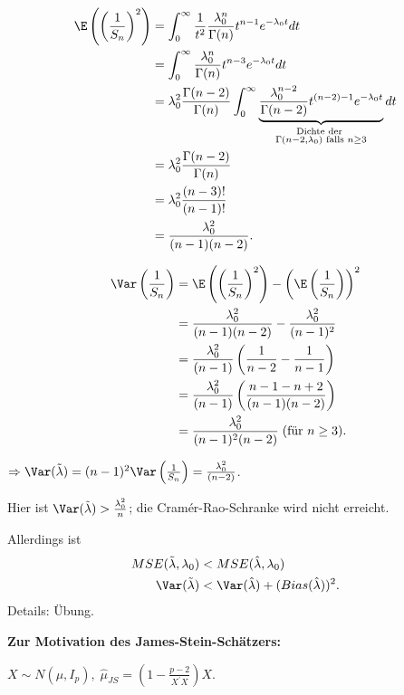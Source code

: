 \documentclass{tstextbook}
\begin{document}
\begin{example}
	\[
	\begin{aligned}
		\E\left(\left(\frac{1}{S_n}\right)^2\right) & =  \int_{0}^{\infty} \frac{1}{t^2}\frac{\lambda_0^n}{\Gamma(n)}t^{n-1}e^{-\lambda_0t}dt \\
		& = \int_{0}^{\infty} \frac{\lambda_0^n}{\Gamma(n)}t^{n-3}e^{-\lambda_0t}dt \\
		& = \lambda_0^2 \frac{\Gamma(n-2)}{\Gamma(n)} \int_{0}^{\infty} \underbrace{\frac{\lambda_0^{n-2}}{\Gamma(n-2)}t^{(n-2)-1}e^{-\lambda_0t}}_{\substack{\text{Dichte der } \\ \Gamma(n-2,\lambda_0) \text{ falls }n\ge3}} dt \\
		& = \lambda_0^2 \frac{\Gamma(n-2)}{\Gamma(n)} \\
		& = \lambda_0^2 \frac{(n-3)!}{(n-1)!} \\
		& = \frac{\lambda_0^2}{(n-1)(n-2)}.
	\end{aligned}
	\]
	
	\[
	\begin{aligned}
		\Var\left(\frac{1}{S_n}\right) & = \E\left(\left(\frac{1}{S_n}\right)^2\right) - \left(\E\left(\frac{1}{S_n}\right)\right)^2 \\
		& = \frac{\lambda_0^2}{(n-1)(n-2)} - \frac{\lambda_0^2}{(n-1)^2} \\
		& = \frac{\lambda_0^2}{(n-1)}\left(\frac{1}{n-2}-\frac{1}{n-1}\right) \\
		& = \frac{\lambda_0^2}{(n-1)}\left(\frac{n-1-n+2}{(n-1)(n-2)}\right) \\
		& = \frac{\lambda_0^2}{(n-1)^2(n-2)} \; (\text{für }n\ge3).
	\end{aligned}
	\]
	
	$ \Rightarrow \Var(\tilde{\lambda}) = (n-1)^2\Var\left(\frac{1}{S_n}\right) = \frac{\lambda_0^2}{(n-2)} $. 
	
	Hier ist $ \Var(\tilde{\lambda}) > \frac{\lambda_0^2}{n} $; die Cramér-Rao-Schranke wird nicht erreicht.
	
	Allerdings ist 
	\[
	\begin{aligned}
		MSE(\tilde{\lambda},\lambda_0) & < MSE(\hat{\lambda},\lambda_0) \\
		\Var(\tilde{\lambda}) & < \Var(\hat{\lambda}) + (Bias(\hat{\lambda}))^2.
	\end{aligned}
	\]
	Details: Übung.
\end{example}

\textbf{Zur Motivation des James-Stein-Schätzers:}

	$ X\sim N(\mu,I_p), \; \hat{\mu}_{JS} = \left(1-\frac{p-2}{X^\prime X}\right)X $. 
	
\end{document}
